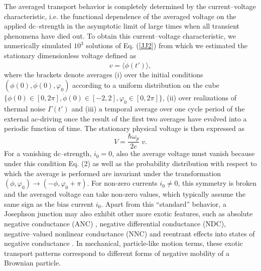 \documentclass{physeauth}
\begin{document}
The averaged transport behavior is completely determined by the
current--voltage characteristic, i.e. the functional dependence of the
averaged voltage on the applied dc--strength in the asymptotic limit of
large times when all transient phenomena have died out.   
To obtain this current--voltage characteristic, we numerically simulated $10^3$  solutions of Eq.
(\ref{JJ2}) from which we  estimated   the stationary dimensionless voltage defined as
%
\begin{equation} \label{v}
v=\langle \dot \phi(t') \rangle,
\end{equation}
% 
where the brackets denote averages (i) over the initial conditions $(
\phi(0), \dot\phi(0), \varphi_0)$ according to a uniform distribution
on the cube $\{\phi(0)\in [0,2 \pi], \dot{\phi}(0)\in [-2,2], \varphi_{0}
\in [0,2 \pi] \}$, (ii) over realizations of thermal noise $\Gamma(t')$
and (iii) a temporal average over one cycle
period of the external ac-driving once  the result of the first two
averages  have evolved  into a
periodic function of time. The stationary physical voltage is then expressed as
%
\begin{equation}
\label{V}
V= \frac{\hbar \omega_p}{2e} \; v.
\end{equation}
% 
For a vanishing dc--strength, $i_{0}=0$, also the average voltage must vanish
because under this condition Eq. (2) as well as the probability
distribution with respect to which the average is performed are  
invariant under the transformation 
$(\phi, \varphi_0) \to (-\phi, \varphi_0 + \pi)$. For  non-zero  currents $i_0
\ne 0$, this symmetry is broken and the
averaged voltage can take non-zero values, which typically assume the
same sign as the bias current $i_0$. 
Apart from this ``standard'' behavior, a Josephson junction
may also exhibit other more exotic features, such as absolute negative
conductance (ANC) \cite{machuraPRL,aip}, negative differential
conductance (NDC), negative--valued nonlinear conductance (NNC) and 
reentrant effects into states of negative conductance
\cite{aip,kosturPRB}.  In mechanical, particle-like motion terms,
these exotic transport 
patterns correspond to different forms of negative
mobility of a Brownian particle.
\end{document}
